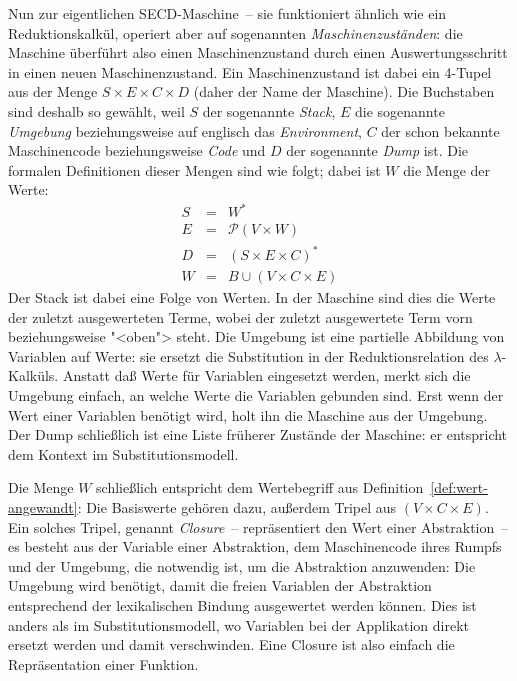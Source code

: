 Nun zur eigentlichen SECD-Maschine~-- sie funktioniert ähnlich wie ein
Reduktionskalkül, operiert aber auf sogenannten
\textit{Maschinenzuständen}: die Maschine überführt also einen
Maschinenzustand durch einen Auswertungsschritt in einen neuen
Maschinenzustand.  Ein Maschinenzustand ist dabei ein 4-Tupel aus der
Menge $S\times E\times C\times D$ (daher der Name der Maschine).  Die
Buchstaben sind deshalb so gewählt, weil $S$ der sogenannte
\textit{Stack}, $E$ die sogenannte
\textit{Umgebung} beziehungsweise auf englisch das
\textit{Environment}, $C$ der schon bekannte
Maschinencode beziehungsweise \textit{Code} und $D$ der
sogenannte \textit{Dump} ist.  Die formalen Definitionen
dieser Mengen sind wie folgt; dabei ist $W$ die Menge der Werte:
%
\begin{eqnarray*}
  S &=& W^\ast\\
  E &=& \mathcal{P}(V\times W)\\
  D &=& (S\times E \times C)^\ast\\
  W &=& B \cup (V\times C\times E)
\end{eqnarray*}
%
Der Stack ist dabei eine Folge von Werten.  In der Maschine sind dies
die Werte der zuletzt ausgewerteten Terme, wobei der zuletzt
ausgewertete Term vorn beziehungsweise "<oben"> steht.  Die Umgebung ist eine
partielle Abbildung von Variablen auf Werte: sie ersetzt die
Substitution in der Reduktionsrelation des $\lambda$-Kalküls.  Anstatt
daß Werte für Variablen eingesetzt werden, merkt sich die Umgebung
einfach, an welche Werte die Variablen gebunden sind.  Erst wenn der
Wert einer Variablen benötigt wird, holt ihn die Maschine aus der
Umgebung.  Der Dump schließlich ist eine Liste früherer Zustände der
Maschine: er entspricht dem Kontext im
Substitutionsmodell.

Die Menge $W$ schließlich entspricht dem Wertebegriff aus
Definition~\ref{def:wert-angewandt}: Die Basiswerte gehören dazu,
außerdem Tripel aus $(V\times C\times E)$.  Ein solches Tripel,
genannt \textit{Closure}~-- repräsentiert den Wert
einer Abstraktion~-- es besteht aus der Variable einer Abstraktion,
dem Maschinencode ihres Rumpfs und der Umgebung, die notwendig ist, um
die Abstraktion anzuwenden: Die Umgebung wird benötigt, damit die
freien Variablen der Abstraktion entsprechend der lexikalischen
Bindung ausgewertet werden können.  Dies
ist anders als im Substitutionsmodell, wo Variablen bei der
Applikation direkt ersetzt werden und damit verschwinden.  Eine
Closure ist also einfach die Repräsentation einer Funktion.

